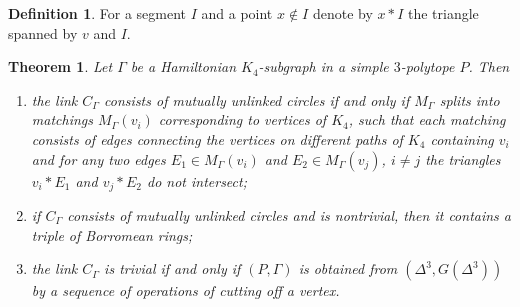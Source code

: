 \documentclass[12pt]{amsart}
\newtheorem{theorem}[formula]{Theorem}
\theoremstyle{definition}
\newtheorem{definition}[formula]{Definition}
\theoremstyle{remark}
\begin{document}
\begin{definition}
For a segment $I$ and a point $x\notin I$ denote by $x*I$ the triangle spanned by $v$ and $I$.
\end{definition}
\begin{theorem}\label{K4UL}
Let $\Gamma$ be a Hamiltonian $K_4$-subgraph in a simple $3$-polytope $P$.
Then 
\begin{enumerate}
\item the link $C_\Gamma$ consists of mutually unlinked circles if and only if $M_{\Gamma}$ splits
into matchings $M_{\Gamma}(v_i)$ corresponding to vertices of $K_4$, such that each matching 
consists of edges connecting the vertices on different paths of $K_4$ containing $v_i$
and for any two edges $E_1\in M_{\Gamma}(v_i)$ and $E_2\in M_{\Gamma}(v_j)$, $i\ne j$
the triangles $v_i*E_1$ and $v_j*E_2$ do not intersect;
\item if $C_\Gamma$ consists of mutually unlinked circles and is nontrivial, then it contains 
a triple of Borromean rings; 
\item the link $C_\Gamma$ is trivial if and only if  $(P,\Gamma)$ is obtained from $(\Delta^3,G(\Delta^3))$
by a sequence of operations of cutting off a vertex.
\end{enumerate}
\end{theorem}
\end{document}
